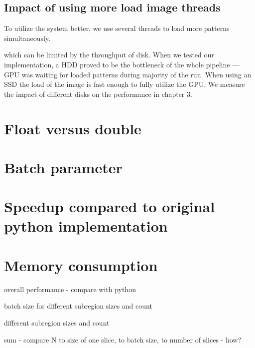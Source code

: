 \subsection{Impact of using more load image threads}

To utilize the system better, we use several threads to load more patterns simultaneously. 

which can be limited by the throughput of disk. When we tested our implementation, a HDD proved to be the bottleneck of the whole pipeline --- GPU was waiting for loaded patterns during majority of the run. When using an SSD the load of the image is fast enough to fully utilize the GPU. We measure the impact of different disks on the performance in chapter 3.

\section{Float versus double}


\section{Batch parameter}
\label{batch-param-eval}


\section{Speedup compared to original python implementation}


\section{Memory consumption}


overall performance - compare with python

batch size for different subregion sizes and count

different subregion sizes and count

sum - compare N to size of one slice, to batch size, to number of slices - how?